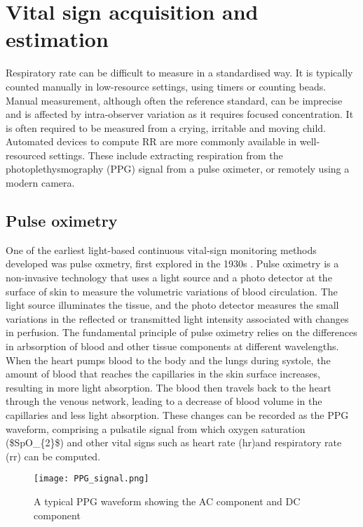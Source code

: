 \section{Vital sign acquisition and estimation}

Respiratory rate can be difficult to measure in a standardised way. It is typically counted manually in low-resource settings, using timers or counting beads. Manual measurement, although often the reference standard, can be imprecise and is affected by intra-observer variation as it requires focused concentration. It is often required to be measured from a crying, irritable and moving child. Automated devices to compute RR are more commonly available in well-resourced settings. These include extracting respiration from the photoplethysmography (PPG) signal from a pulse oximeter, or remotely using a modern camera.

\subsection{Pulse oximetry}

One of the earliest light-based continuous vital-sign monitoring methods developed was pulse oxmetry, first explored in the 1930s \cite{elgendi2019use}. Pulse oximetry is a non-invasive technology that uses a light source and a photo detector at the surface of skin to measure the volumetric variations of blood circulation. 
The light source illuminates the tissue, and the photo detector measures the small variations in the reflected or transmitted light intensity associated with changes in perfusion. The fundamental principle of pulse oximetry relies on the differences in arbsorption of blood and other tissue components at different wavelengths\cite{ugnell1995time}.
When the heart pumps blood to the body and the lungs during systole, the amount of blood that reaches the capillaries in the skin surface increases, resulting in more light absorption. The blood then travels back to the heart through the venous network, leading to a decrease of blood volume in the capillaries and less light absorption\cite{sun2015photoplethysmography}. These changes can be recorded as the PPG waveform, comprising a pulsatile signal from which oxygen saturation (\gls{$SpO_{2}$}) and other vital signs such as heart rate (\gls{hr})and respiratory rate (\gls{rr}) can be computed.

\begin{figure}
  \centering
    \texttt{[image: PPG\_signal.png]}
    \caption[A typical PPG waveform]
    {
    A typical PPG waveform showing the AC component and DC component \cite{guo2015reflective}
    }    
    \label{ppgsignal}
\end{figure}

